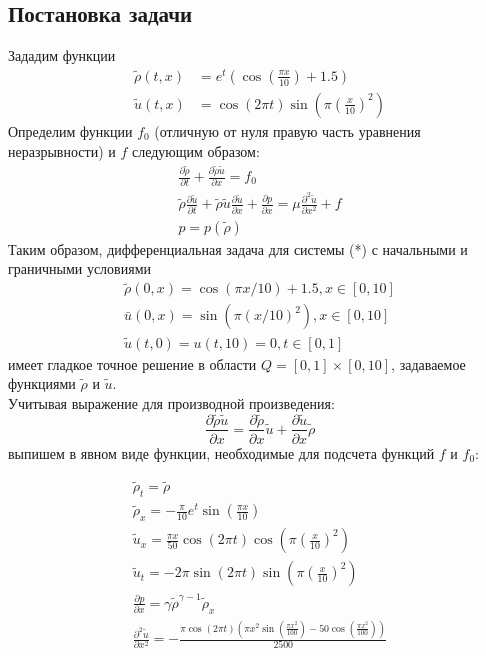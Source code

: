 \documentclass[12pt]{article}
\begin{document}
\subsection{Постановка задачи}
Зададим функции
$$
\begin{aligned}
\tilde{\rho}(t, x) &=e^{t}(\cos (\frac{\pi x}{10})+1.5) \\
\tilde{u}(t, x) &=\cos (2 \pi t) \sin \left(\pi(\frac{x}{10})^{2}\right)
\end{aligned}
$$
Определим функции $f_{0}$ (отличную от нуля правую часть уравнения неразрывности) и $f$ следующим образом:
$$
\begin{array}{l}
\frac{\partial \tilde{\rho}}{\partial t}+\frac{\partial \tilde{\rho} \tilde{u}}{\partial x}=f_{0} \\
\tilde{\rho} \frac{\partial \tilde{u}}{\partial t}+\tilde{\rho} \tilde{u} \frac{\partial \tilde{u}}{\partial x}+\frac{\partial p}{\partial x}=\mu \frac{\partial^{2} \tilde{u}}{\partial x^{2}}+f \\
p=p(\tilde{\rho})
\end{array}
$$
Таким образом, дифференциальная задача для системы (*) с начальными и граничными условиями
$$
\begin{array}{l}
\tilde{\rho}(0, x)=\cos (\pi x / 10)+1.5, x \in[0,10] \\
\bar{u}(0, x)=\sin \left(\pi(x / 10)^{2}\right), x \in[0,10] \\
\tilde{u}(t, 0)=u(t, 10)=0, t \in[0,1]
\end{array}
$$
имеет гладкое точное решение в области $Q = [0,1] \times[0, 10]$, задаваемое функциями $\tilde{\rho}$
и $\tilde{u}$.
\\
Учитывая выражение для производной произведения:
$$
\frac{\partial \tilde{\rho}\tilde{u}}{\partial x} = 
\frac{\partial \tilde{\rho}}{\partial x}\tilde{u} + \frac{\partial \tilde{u}}{\partial x}\tilde{\rho}
$$
выпишем в явном виде функции, необходимые для подсчета функций $f$ и $f_{0}$:

$$
  \begin{array}{l}
    \tilde{\rho}_{t} = \tilde{\rho} \\
    \tilde{\rho}_{x} = -\frac{\pi}{10} e^{t} \sin (\frac{\pi x}{10}) \\
    \tilde{u}_{x} = \frac{\pi x}{50} \cos (2 \pi t) \cos ( \pi (\frac{x}      {10})^{2}) \\
    \tilde{u}_{t} = -2\pi \sin (2 \pi t) \sin (\pi (\frac{x}{10})^{2})\\
    \frac{\partial p}{\partial x} = \gamma \tilde{\rho}^{\gamma - 1}     \tilde{\rho}_{x} \\
    \frac{\partial^{2}\tilde{u}}{\partial x^{2}} = -\frac{\pi \cos (2 \pi t) (\pi x^{2} \sin (\frac{\pi x^{2}}{100}) - 50 \cos (\frac{\pi x^{2}}{100}))}{2500} 
    \end{array}
$$
\end{document}
